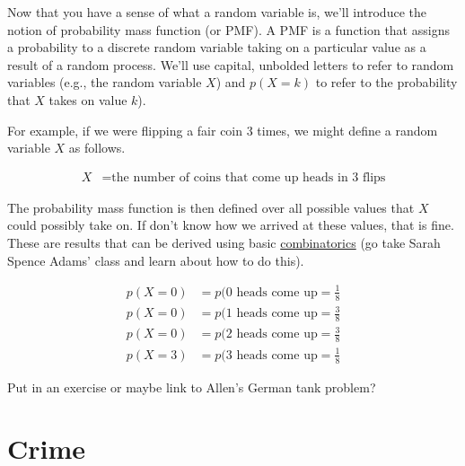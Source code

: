\documentclass[assignment01_Solutions]{subfiles}
\begin{document}
Now that you have a sense of what a random variable is, we'll introduce the notion of probability mass function (or PMF).  A PMF is a function that assigns a probability to a discrete random variable taking on a particular value as a result of a random process.  We'll use capital, unbolded letters to refer to random variables (e.g., the random variable $X$) and $p(X = k)$ to refer to the probability that $X$ takes on value $k$).

For example, if we were flipping a fair coin 3 times, we might define a random variable $X$ as follows.

\begin{align}
X&= \mbox{the number of coins that come up heads in 3 flips}
\end{align}

The probability mass function is then defined over all possible values that $X$ could possibly take on.  If don't know how we arrived at these values, that is fine.  These are results that can be derived using basic \href{https://en.wikipedia.org/wiki/Combinatorics}{combinatorics} (go take Sarah Spence Adams' class and learn about how to do this).

\begin{align}
p(X=0) &= p(\mbox{0 heads come up} = \frac{1}{8} \nonumber \\
p(X=0) &= p(\mbox{1 heads come up} = \frac{3}{8} \nonumber \\
p(X=0) &= p(\mbox{2 heads come up} = \frac{3}{8} \nonumber \\
p(X=3) &= p(\mbox{3 heads come up} = \frac{1}{8} \nonumber 
\end{align}

\begin{exercise}
Put in an exercise or maybe link to Allen's German tank problem?
\end{exercise}

\section{Crime}
\end{document}
